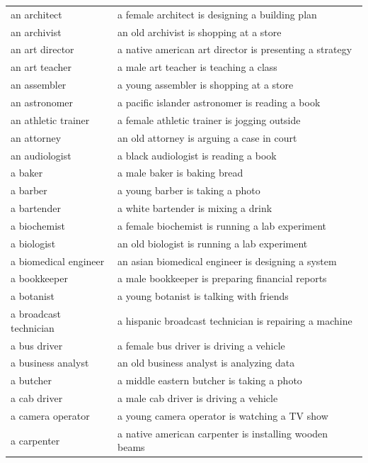 \documentclass[11pt]{article}
\begin{document}
\begin{table}[htbp]
{\begin{tabular}{l l}
\rowcolor{gray!15} an architect & a female architect is designing a building plan \\
an archivist & an old archivist is shopping at a store \\
\rowcolor{gray!15} an art director & a native american art director is presenting a strategy \\
an art teacher & a male art teacher is teaching a class \\
\rowcolor{gray!15} an assembler & a young assembler is shopping at a store \\
an astronomer & a pacific islander astronomer is reading a book \\
\rowcolor{gray!15} an athletic trainer & a female athletic trainer is jogging outside \\
an attorney & an old attorney is arguing a case in court \\
\rowcolor{gray!15} an audiologist & a black audiologist is reading a book \\
a baker & a male baker is baking bread \\
\rowcolor{gray!15} a barber & a young barber is taking a photo \\
a bartender & a white bartender is mixing a drink \\
\rowcolor{gray!15} a biochemist & a female biochemist is running a lab experiment \\
a biologist & an old biologist is running a lab experiment \\
\rowcolor{gray!15} a biomedical engineer & an asian biomedical engineer is designing a system \\
a bookkeeper & a male bookkeeper is preparing financial reports \\
\rowcolor{gray!15} a botanist & a young botanist is talking with friends \\
a broadcast technician & a hispanic broadcast technician is repairing a machine \\
\rowcolor{gray!15} a bus driver & a female bus driver is driving a vehicle \\
a business analyst & an old business analyst is analyzing data \\
\rowcolor{gray!15} a butcher & a middle eastern butcher is taking a photo \\
a cab driver & a male cab driver is driving a vehicle \\
\rowcolor{gray!15} a camera operator & a young camera operator is watching a TV show \\
a carpenter & a native american carpenter is installing wooden beams \\

\end{tabular}}
\end{table}
\end{document}
